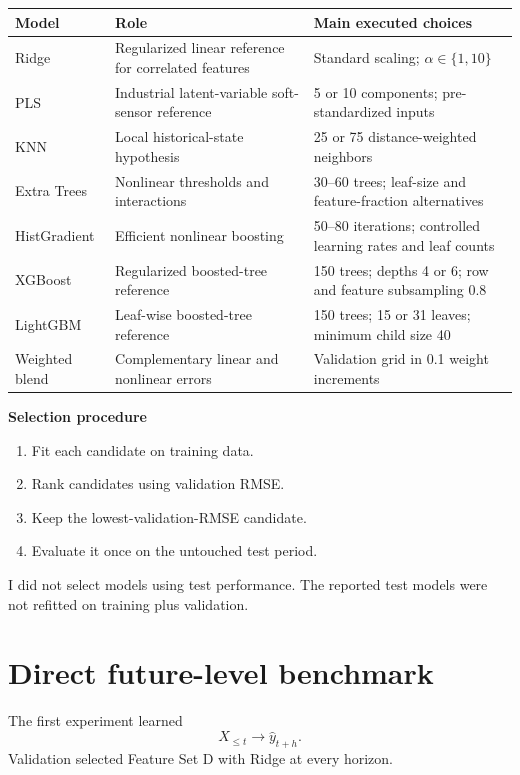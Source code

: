 \documentclass[10pt,a4paper]{article}
\begin{document}
\begin{tabularx}{\textwidth}{L{0.19\textwidth}Y Y}
\toprule
\textbf{Model} & \textbf{Role} & \textbf{Main executed choices} \\
\midrule
Ridge & Regularized linear reference for correlated features & Standard scaling; $\alpha\in\{1,10\}$ \\
PLS & Industrial latent-variable soft-sensor reference & 5 or 10 components; pre-standardized inputs \\
KNN & Local historical-state hypothesis & 25 or 75 distance-weighted neighbors \\
Extra Trees & Nonlinear thresholds and interactions & 30--60 trees; leaf-size and feature-fraction alternatives \\
HistGradient & Efficient nonlinear boosting & 50--80 iterations; controlled learning rates and leaf counts \\
XGBoost & Regularized boosted-tree reference & 150 trees; depths 4 or 6; row and feature subsampling 0.8 \\
LightGBM & Leaf-wise boosted-tree reference & 150 trees; 15 or 31 leaves; minimum child size 40 \\
Weighted blend & Complementary linear and nonlinear errors & Validation grid in 0.1 weight increments \\
\bottomrule
\end{tabularx}

\textbf{Selection procedure}
\begin{enumerate}
  \item Fit each candidate on training data.
  \item Rank candidates using validation RMSE.
  \item Keep the lowest-validation-RMSE candidate.
  \item Evaluate it once on the untouched test period.
\end{enumerate}
I did not select models using test performance. The reported test models were not refitted on training plus validation.

\section{Direct future-level benchmark}

The first experiment learned
\[
X_{\leq t}\longrightarrow \hat y_{t+h}.
\]
Validation selected Feature Set D with Ridge at every horizon.
\end{document}
